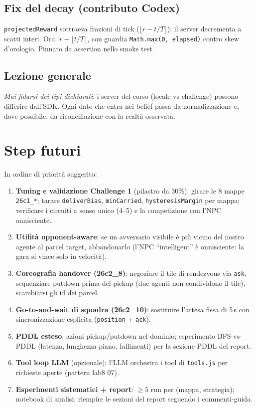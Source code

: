 \documentclass[11pt,a4paper]{article}
\newcommand{\file}[1]{\texttt{#1}}
\newcommand{\code}[1]{\texttt{#1}}
\begin{document}
\subsection{Fix del decay (contributo Codex)}

\code{projectedReward} sottraeva frazioni di tick
($\lfloor r - t/T \rfloor$); il server decrementa a scatti interi. Ora:
$r - \lfloor t/T \rfloor$, con guardia \code{Math.max(0, elapsed)} contro
skew d'orologio. Pinnato da assertion nello smoke test.

\subsection{Lezione generale}

\emph{Mai fidarsi dei tipi dichiarati}: i server del corso (locale vs
challenge) possono differire dall'SDK. Ogni dato che entra nei belief passa
da normalizzazione e, dove possibile, da riconciliazione con la realtà
osservata.

\section{Step futuri}

In ordine di priorità suggerito:

\begin{enumerate}
  \item \textbf{Tuning e validazione Challenge 1} (pilastro da 30\%):
    girare le 8 mappe \code{26c1\_*}; tarare \code{deliverBias},
    \code{minCarried}, \code{hysteresisMargin} per mappa; verificare i
    circuiti a senso unico (4--5) e la competizione con l'NPC onnisciente.
  \item \textbf{Utilità opponent-aware}: se un avversario visibile è più
    vicino del nostro agente al parcel target, abbandonarlo (l'NPC
    ``intelligent'' è onnisciente: la gara si vince solo in velocità).
  \item \textbf{Coreografia handover (26c2\_8)}: negoziare il tile di
    rendezvous via \code{ask}, sequenziare putdown-prima-del-pickup
    (due agenti non condividono il tile), scambiarsi gli id dei parcel.
  \item \textbf{Go-to-and-wait di squadra (26c2\_10)}: sostituire
    l'attesa fissa di 5\,s con sincronizzazione esplicita
    (\code{position} + \code{ack}).
  \item \textbf{PDDL esteso}: azioni pickup/putdown nel dominio;
    esperimento BFS-vs-PDDL (latenza, lunghezza piano, fallimenti) per la
    sezione PDDL del report.
  \item \textbf{Tool loop LLM} (opzionale): l'LLM orchestra i tool di
    \file{tools.js} per richieste aperte (pattern lab8 07).
  \item \textbf{Esperimenti sistematici + report}: $\ge 5$ run per
    (mappa, strategia); notebook di analisi; riempire le sezioni del
    report seguendo i commenti-guida.
\end{enumerate}
\end{document}
